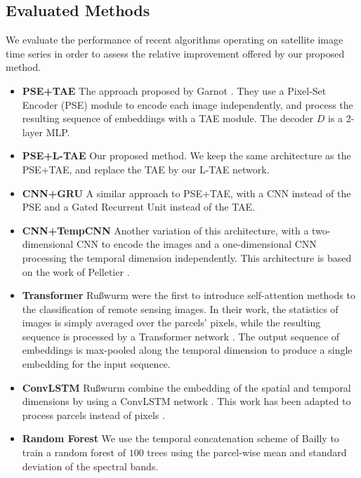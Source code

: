 \documentclass[runningheads]{llncs}
\begin{document}
\subsection{Evaluated Methods}
We evaluate the performance of recent algorithms operating on satellite image time series in order to assess the relative improvement offered by our proposed method.
\begin{itemize}
    \item\textbf{PSE+TAE} 
    The approach proposed by Garnot \etal \cite{garnot2019satellite}. They use a Pixel-Set Encoder (PSE) module to encode each image independently, and process the resulting sequence of embeddings with a TAE module. The decoder $D$ is a 2-layer MLP.
    \item\textbf{PSE+L-TAE} Our proposed method. We keep the same architecture as the PSE+TAE, and replace the TAE by our L-TAE network.
    \item\textbf{CNN+GRU} 
    A similar approach \cite{garnot2019time} to {PSE+TAE}, with a CNN instead of the PSE and a Gated Recurrent Unit \cite{chung2014GRU} instead of the TAE.
    \item\textbf{CNN+TempCNN} 
    Another variation of this architecture, with a two-dimensional CNN to encode the images and a one-dimensional CNN processing the temporal dimension independently.
    This architecture is based on the work of Pelletier \etal \cite{pelletier2019temporal}.
    \item\textbf{Transformer}
    Ru{\ss}wurm \etal were the first to introduce self-attention methods to the classification of remote sensing images. In their work\cite{russwurm2019self}, the statistics of images is simply averaged over the parcels' pixels, while the resulting sequence is processed by a Transformer network \cite{vaswani2017attention}. The output sequence of embeddings is max-pooled along the temporal dimension to produce a single embedding for the input sequence.
    \item\textbf{ConvLSTM} 
    Ru{\ss}wurm \etal \cite{russwurm2018convolutional} combine the embedding of the spatial and temporal dimensions by using a ConvLSTM network \cite{xingjian2015convolutional}. This work has been adapted to process parcels instead of pixels \cite{garnot2019satellite}.
    \item\textbf{Random Forest}
    We use the temporal concatenation scheme of Bailly \etal to train a random forest of $100$ trees using the parcel-wise mean and standard deviation of the spectral bands. 
\end{itemize}
\end{document}
